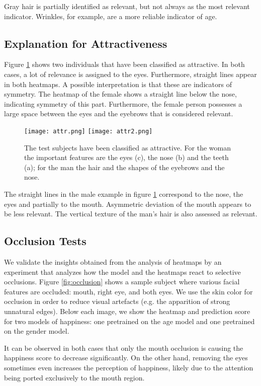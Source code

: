 \documentclass[runningheads]{llncs}
\begin{document}
Gray hair is partially identified as relevant, but not always as the most relevant indicator. Wrinkles, for example, are a more reliable indicator of age.

\subsection{Explanation for Attractiveness}
Figure \ref{fig:attr} shows two individuals that have been classified as attractive. In both cases, a lot of relevance is assigned to the eyes. Furthermore, straight lines appear in both heatmaps. A possible interpretation is that these are indicators of symmetry. The heatmap of the female shows a straight line below the nose, indicating symmetry of this part. Furthermore, the female person possesses a large space between the eyes and the eyebrows that is considered relevant.
\begin{figure}[t]
\centering
\texttt{[image: attr.png]}
\texttt{[image: attr2.png]}
\caption{
The test subjects have been classified as attractive. For the woman the important features are the eyes (c), the nose (b) and the teeth (a); for the man the hair and the shapes of the eyebrows and the nose.
}
\label{fig:attr}
\end{figure}

The straight lines in the male example in figure \ref{fig:attr} correspond to the nose, the eyes and partially to the mouth. Asymmetric deviation of the mouth appears to be less relevant. The vertical texture of the man's hair is also assessed as relevant.

\subsection{Occlusion Tests}

We validate the insights obtained from the analysis of heatmaps by an experiment that analyzes how the model and the heatmaps react to selective occlusions. Figure \ref{fig:occlusion} shows a sample subject where various facial features are occluded: mouth, right eye, and both eyes. We use the skin color for occlusion in order to reduce visual artefacts (e.g. the apparition of strong unnatural edges). Below each image, we show the heatmap and prediction score for two models of happiness: one pretrained on the age model and one pretrained on the gender model.


It can be observed in both cases that only the mouth occlusion is causing the happiness score to decrease significantly. On the other hand, removing the eyes sometimes even increases the perception of happiness, likely due to the attention being ported exclusively to the mouth region.
\end{document}
